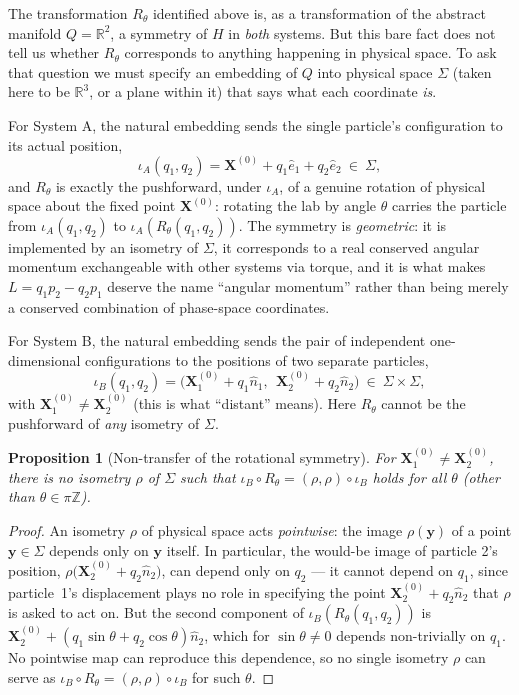 \documentclass[11pt]{article}
\newtheorem{proposition}{Proposition}
\begin{document}
The transformation $R_\theta$ identified above is, as a transformation of the abstract manifold $Q=\mathbb{R}^2$, a symmetry of $H$ in \emph{both} systems. But this bare fact does not tell us whether $R_\theta$ corresponds to anything happening in physical space. To ask that question we must specify an embedding of $Q$ into physical space $\Sigma$ (taken here to be $\mathbb{R}^3$, or a plane within it) that says what each coordinate \emph{is}.

For System A, the natural embedding sends the single particle's configuration to its actual position,
\[
\iota_A(q_1,q_2)=\mathbf{X}^{(0)}+q_1\hat{e}_1+q_2\hat{e}_2 \ \in\ \Sigma,
\]
and $R_\theta$ is exactly the pushforward, under $\iota_A$, of a genuine rotation of physical space about the fixed point $\mathbf{X}^{(0)}$: rotating the lab by angle $\theta$ carries the particle from $\iota_A(q_1,q_2)$ to $\iota_A(R_\theta(q_1,q_2))$. The symmetry is \emph{geometric}: it is implemented by an isometry of $\Sigma$, it corresponds to a real conserved angular momentum exchangeable with other systems via torque, and it is what makes $L=q_1p_2-q_2p_1$ deserve the name ``angular momentum'' rather than being merely a conserved combination of phase-space coordinates.

For System B, the natural embedding sends the pair of independent one-dimensional configurations to the positions of two separate particles,
\[
\iota_B(q_1,q_2)=\Big(\mathbf{X}_1^{(0)}+q_1\hat{n}_1,\ \ \mathbf{X}_2^{(0)}+q_2\hat{n}_2\Big)\ \in\ \Sigma\times\Sigma,
\]
with $\mathbf{X}_1^{(0)}\neq\mathbf{X}_2^{(0)}$ (this is what ``distant'' means). Here $R_\theta$ cannot be the pushforward of \emph{any} isometry of $\Sigma$.

\begin{proposition}[Non-transfer of the rotational symmetry]
For $\mathbf{X}_1^{(0)}\neq\mathbf{X}_2^{(0)}$, there is no isometry $\rho$ of $\Sigma$ such that $\iota_B\circ R_\theta=(\rho,\rho)\circ\iota_B$ holds for all $\theta$ (other than $\theta\in\pi\mathbb{Z}$).
\end{proposition}

\begin{proof}
An isometry $\rho$ of physical space acts \emph{pointwise}: the image $\rho(\mathbf{y})$ of a point $\mathbf{y}\in\Sigma$ depends only on $\mathbf{y}$ itself. In particular, the would-be image of particle 2's position, $\rho\big(\mathbf{X}_2^{(0)}+q_2\hat n_2\big)$, can depend only on $q_2$ --- it cannot depend on $q_1$, since particle~1's displacement plays no role in specifying the point $\mathbf{X}_2^{(0)}+q_2\hat{n}_2$ that $\rho$ is asked to act on. But the second component of $\iota_B(R_\theta(q_1,q_2))$ is $\mathbf{X}_2^{(0)}+(q_1\sin\theta+q_2\cos\theta)\hat n_2$, which for $\sin\theta\neq 0$ depends non-trivially on $q_1$. No pointwise map can reproduce this dependence, so no single isometry $\rho$ can serve as $\iota_B\circ R_\theta=(\rho,\rho)\circ\iota_B$ for such $\theta$.
\end{proof}
\end{document}
